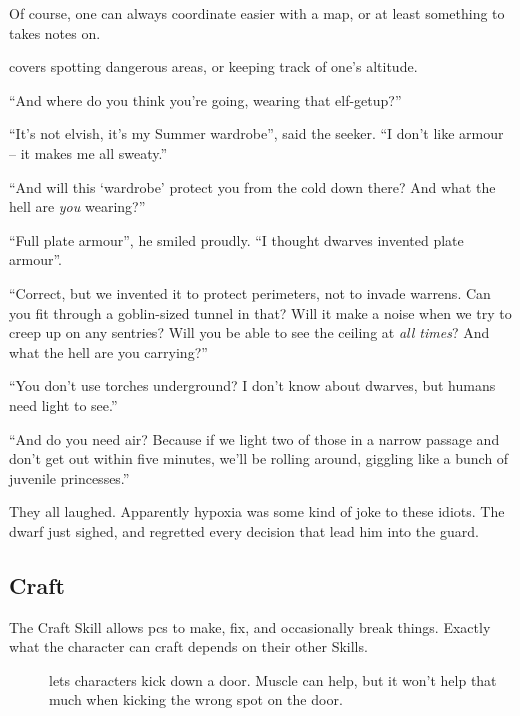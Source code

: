 \begin{multicols}{2}
\begin{description}
    Of course, one can always coordinate easier with a map, or at least something to takes notes on.
  \item[\roll{Wits}{Caving}]
    covers spotting dangerous areas, or keeping track of one's altitude.
\end{description}

\begin{exampletext}

  ``And where do you think you're going, wearing that elf-getup?''

  ``It's not elvish, it's my Summer wardrobe'', said the \gls{seeker}.
  ``I don't like armour -- it makes me all sweaty.''

  ``And will this `wardrobe' protect you from the cold down there?
  And what the hell are \emph{you} wearing?''

  ``Full plate armour'', he smiled proudly.
  ``I thought dwarves invented plate armour''.

  ``Correct, but we invented it to protect perimeters, not to invade warrens.
  Can you fit through a goblin-sized tunnel in that?
  Will it make a noise when we try to creep up on any sentries?
  Will you be able to see the ceiling at \emph{all times}?
  And what the hell are you carrying?''

  ``You don't use torches underground?
  I don't know about dwarves, but humans need light to see.''

  ``And do you need air?
  Because if we light two of those in a narrow passage and don't get out within five minutes, we'll be rolling around, giggling like a bunch of juvenile princesses.''

  They all laughed.
  Apparently hypoxia was some kind of joke to these idiots.
  The dwarf just sighed, and regretted every decision that lead him into the \gls{guard}.
  
\end{exampletext}

\subsection{Craft}

The Craft Skill allows \glspl{pc} to make, fix, and occasionally break things.
Exactly what the character can craft depends on their other Skills.

\craftingReqList

\begin{description}
  \item[]
    lets characters kick down a door.
    Muscle can help, but it won't help that much when kicking the wrong spot on the door.


\end{description}
\end{multicols}
